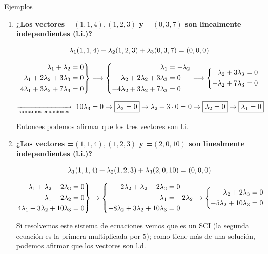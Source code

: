 \documentclass[11pt,a4paper]{article}
\newcommand{\fmm}[1]{\setbox0=\hbox{$#1$}\ifdim\wd0>\linewidth\fmdisp{#1}\else\mbox{\box0}\fi}
\newcommand{\fmdisp}[1]{\[\setbox2=\hbox{$\displaystyle #1$}\ifdim\wd2>\linewidth\resizebox{\linewidth}{!}{\box2}\else\box2\fi\]}
\begin{document}
\begin{fmex}{Ejemplos}
\begin{enumerate}[label=\textbf{\arabic*.},leftmargin=*]
\item \textbf{¿Los vectores \fmm{(1,1,4),(1,2,3)} y \fmm{(0,3,7)} son linealmente independientes (l.i.)?}

\fmdisp{\lambda_1(1,1,4)+\lambda_2(1,2,3)+\lambda_3(0,3,7)=(0,0,0)}

\fmdisp{\left.\begin{aligned}\lambda_1+\lambda_2&=0\\ \lambda_1+2\lambda_2+3\lambda_3&=0\\ 4\lambda_1+3\lambda_2+7\lambda_3&=0\end{aligned}\right\}\longrightarrow\left\{\begin{aligned}\lambda_1&=-\lambda_2\\ -\lambda_2+2\lambda_2+3\lambda_3&=0\\ -4\lambda_2+3\lambda_2+7\lambda_3&=0\end{aligned}\right.\longrightarrow\left\{\begin{aligned}\lambda_2+3\lambda_3&=0\\ -\lambda_2+7\lambda_3&=0\end{aligned}\right.}

\fmdisp{\xrightarrow[\text{sumamos ecuaciones}]{}\ 10\lambda_3=0\rightarrow\boxed{\lambda_3=0}\rightarrow\lambda_2+3\cdot0=0\rightarrow\boxed{\lambda_2=0}\rightarrow\boxed{\lambda_1=0}}

Entonces podemos afirmar que los tres vectores son l.i.
\item \textbf{¿Los vectores \fmm{(1,1,4),(1,2,3)} y \fmm{(2,0,10)} son linealmente independientes (l.i.)?}

\fmdisp{\lambda_1(1,1,4)+\lambda_2(1,2,3)+\lambda_3(2,0,10)=(0,0,0)}

\fmdisp{\left.\begin{aligned}\lambda_1+\lambda_2+2\lambda_3&=0\\ \lambda_1+2\lambda_2&=0\\ 4\lambda_1+3\lambda_2+10\lambda_3&=0\end{aligned}\right\}\rightarrow\left\{\begin{aligned}-2\lambda_2+\lambda_2+2\lambda_3&=0\\ \lambda_1&=-2\lambda_2\\ -8\lambda_2+3\lambda_2+10\lambda_3&=0\end{aligned}\right.\rightarrow\left\{\begin{aligned}-\lambda_2+2\lambda_3&=0\\ -5\lambda_2+10\lambda_3&=0\end{aligned}\right.}

Si resolvemos este sistema de ecuaciones vemos que es un SCI (la segunda ecuación es la primera multiplicada por 5); como tiene más de una solución, podemos afirmar que los vectores son l.d.
\end{enumerate}
\end{fmex}
\end{document}
